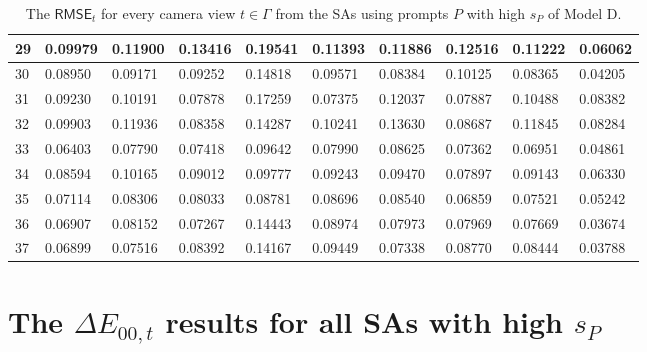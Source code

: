 \begin{table}[H]
{\begin{tabular}{|l|l|l|l|l|l|l|l|l|l|}
        29 & 0.09979 & 0.11900 & 0.13416 & 0.19541 & 0.11393 & 0.11886 & 0.12516 & 0.11222 & 0.06062 \\ \hline
        30 & 0.08950 & 0.09171 & 0.09252 & 0.14818 & 0.09571 & 0.08384 & 0.10125 & 0.08365 & 0.04205 \\ \hline
        31 & 0.09230 & 0.10191 & 0.07878 & 0.17259 & 0.07375 & 0.12037 & 0.07887 & 0.10488 & 0.08382 \\ \hline
        32 & 0.09903 & 0.11936 & 0.08358 & 0.14287 & 0.10241 & 0.13630 & 0.08687 & 0.11845 & 0.08284 \\ \hline
        33 & 0.06403 & 0.07790 & 0.07418 & 0.09642 & 0.07990 & 0.08625 & 0.07362 & 0.06951 & 0.04861 \\ \hline
        34 & 0.08594 & 0.10165 & 0.09012 & 0.09777 & 0.09243 & 0.09470 & 0.07897 & 0.09143 & 0.06330 \\ \hline
        35 & 0.07114 & 0.08306 & 0.08033 & 0.08781 & 0.08696 & 0.08540 & 0.06859 & 0.07521 & 0.05242 \\ \hline
        36 & 0.06907 & 0.08152 & 0.07267 & 0.14443 & 0.08974 & 0.07973 & 0.07969 & 0.07669 & 0.03674 \\ \hline
        37 & 0.06899 & 0.07516 & 0.08392 & 0.14167 & 0.09449 & 0.07338 & 0.08770 & 0.08444 & 0.03788 \\ \hline
    \end{tabular}}
	\caption{The $ \mathsf{RMSE}_t$ for every camera view $t \in \varGamma$ from the SAs using prompts $P$ with high $s_P$ of Model D.}

\end{table}

\section{The $ \Delta E_{00,t}$ results for all SAs with high $s_P$}

